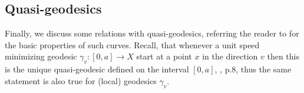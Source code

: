 \documentclass[12pt,leqno,intlimits]{amsart}
\numberwithin{equation}{section}
\theoremstyle{definition}
\theoremstyle{remark}
\newcommand{\pref}[1]{Proposition~\ref{#1}}
\newcommand{\lref}[1]{Lemma~\ref{#1}}
\newcommand{\vol}{\mathrm{vol}}
\def\:{\colon}
\begin{document}














\subsection{Quasi-geodesics} \label{subsec:quasi}
Finally, we discuss some relations with quasi-geodesics, referring the reader to \cite{Petsemi} for the basic properties of such curves.
Recall, that whenever a unit speed minimizing   geodesic $\gamma _v \:[0,a] \to X$   start at a point $x$ in the direction $v$ then this is the unique quasi-geodesic defined on the interval $[0,a]$, \cite{PP}, p.8, thus the same statement is also true for  (local) geodesics $\gamma _v$.
\end{document}
